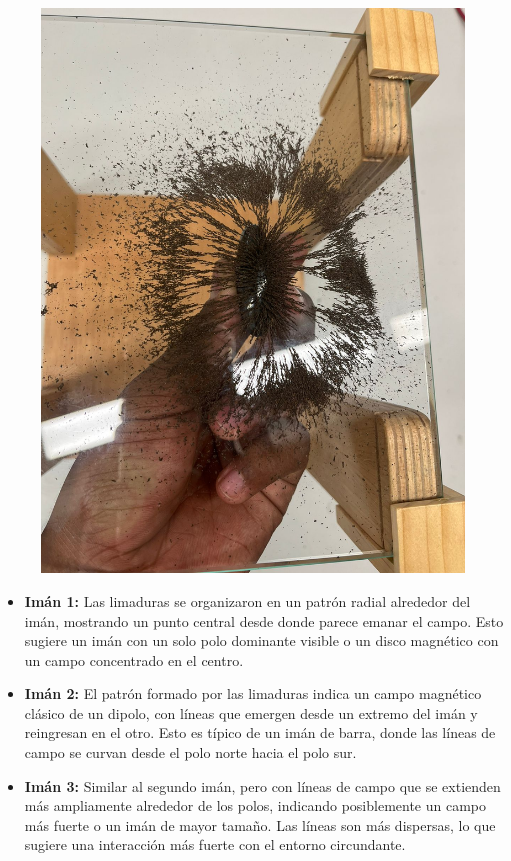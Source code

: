 \begin{figure}[H]
\begin{minipage}{0.45\textwidth}
    \includegraphics[width=\textwidth]{Figures/1. Content/LimadurasHierro2.jpeg}
    \label{fig: Limadura de Hierro 2}
  \end{minipage}
  \hfill

\end{figure}

\begin{itemize}
  \item \textbf{Imán 1:} Las limaduras se organizaron en un patrón radial alrededor del imán, mostrando un punto central desde donde parece emanar el campo. Esto sugiere un imán con un solo polo dominante visible o un disco magnético con un campo concentrado en el centro.

  \item \textbf{Imán 2:} El patrón formado por las limaduras indica un campo magnético clásico de un dipolo, con líneas que emergen desde un extremo del imán y reingresan en el otro. Esto es típico de un imán de barra, donde las líneas de campo se curvan desde el polo norte hacia el polo sur.

  \item \textbf{Imán 3:} Similar al segundo imán, pero con líneas de campo que se extienden más ampliamente alrededor de los polos, indicando posiblemente un campo más fuerte o un imán de mayor tamaño. Las líneas son más dispersas, lo que sugiere una interacción más fuerte con el entorno circundante.
\end{itemize}

